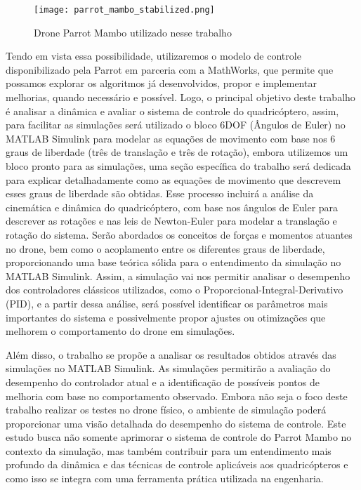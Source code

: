 \begin{figure}[H]
	\centering
	\texttt{[image: parrot\_mambo\_stabilized.png]}
	\caption{Drone Parrot Mambo utilizado nesse trabalho}
	\centering
	\label{drone-parrot}
\end{figure}


Tendo em vista essa possibilidade, utilizaremos o modelo de controle disponibilizado pela Parrot em parceria com a MathWorks, que permite que possamos explorar os algoritmos já desenvolvidos, propor e implementar melhorias, quando necessário e possível. Logo, o principal objetivo deste trabalho é analisar a dinâmica e avaliar o sistema de controle do quadricóptero, assim, para facilitar as simulações será utilizado o bloco 6DOF (Ângulos de Euler) no MATLAB Simulink para modelar as equações de movimento com base nos 6 graus de liberdade (três de translação e três de rotação), embora utilizemos um bloco pronto para as simulações, uma seção específica do trabalho será dedicada para explicar detalhadamente como as equações de movimento que descrevem esses graus de liberdade são obtidas. Esse processo incluirá a análise da cinemática e dinâmica do quadricóptero, com base nos ângulos de Euler para descrever as rotações e nas leis de Newton-Euler para modelar a translação e rotação do sistema. Serão abordados os conceitos de forças e momentos atuantes no drone, bem como o acoplamento entre os diferentes graus de liberdade, proporcionando uma base teórica sólida para o entendimento da simulação no MATLAB Simulink. Assim, a simulação vai nos permitir analisar o desempenho dos controladores clássicos utilizados, como o Proporcional-Integral-Derivativo (PID), e a partir dessa análise, será possível identificar os parâmetros mais importantes do sistema e possivelmente propor ajustes ou otimizações que melhorem o comportamento do drone em simulações.

Além disso, o trabalho se propõe a analisar os resultados obtidos através das simulações no MATLAB Simulink. As simulações permitirão a avaliação do desempenho do controlador atual e a identificação de possíveis pontos de melhoria com base no comportamento observado. Embora não seja o foco deste trabalho realizar os testes no drone físico, o ambiente de simulação poderá proporcionar uma visão detalhada do desempenho do sistema de controle. Este estudo busca não somente aprimorar o sistema de controle do Parrot Mambo no contexto da simulação, mas também contribuir para um entendimento mais profundo da dinâmica e das técnicas de controle aplicáveis aos quadricópteros e como isso se integra com uma ferramenta prática utilizada na engenharia.

